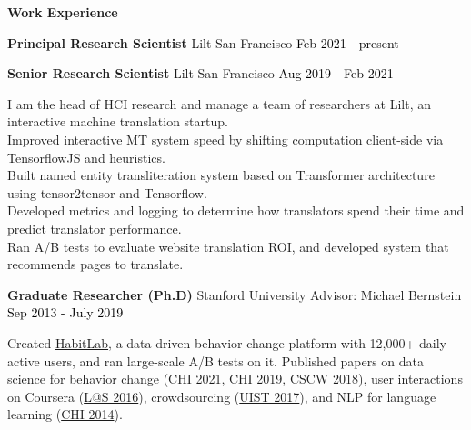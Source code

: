 \documentclass[10pt,A4]{article}
\newcommand{\cvsection}[1]
{
	\begin{center}
		\large\textcolor{sectcol}{\textbf{#1}}
	\end{center}
}
\newcommand{\cvevtzero}[4]
{

	\textbf{#2} \hspace{1mm} \textcolor{bgcol}{#3} \hfill \vspace{2.5pt}\textcolor{black}{#1}

\vspace{-8pt}
\vspace{6pt}

}
\newcommand{\cvevtzeronohrule}[4]
{

  \textbf{#2} \hspace{1mm} \textcolor{bgcol}{#3} \hfill \vspace{2.5pt}\textcolor{black}{#1}

\vspace{-8pt}
\vspace{6pt}

}
\begin{document}
\cvsection{Work Experience}

\cvevtzeronohrule{Feb 2021 - present}{Principal Research Scientist}{\textcolor{sectcol}{Lilt} \hspace{1mm} San Francisco}\\
\cvevtzero{Aug 2019 - Feb 2021}{Senior Research Scientist}{\hspace{3.2mm} \textcolor{sectcol}{Lilt} \hspace{1mm} San Francisco}\\
I am the head of HCI research and manage a team of researchers at Lilt, an interactive machine translation startup.\\
Improved interactive MT system speed by shifting computation client-side via TensorflowJS and heuristics.\\
Built named entity transliteration system based on Transformer architecture using tensor2tensor and Tensorflow.\\
Developed metrics and logging to determine how translators spend their time and predict translator performance.\\
Ran A/B tests to evaluate website translation ROI, and developed system that recommends pages to translate. \\

\vspace{-1mm}

\cvevtzero{Sep 2013 - July 2019}{Graduate Researcher (Ph.D)}{\textcolor{sectcol}{Stanford University} \hspace{1mm} Advisor: Michael Bernstein}\\
Created \hypersetup{urlcolor=black}\href{https://habitlab.github.io}{HabitLab}\hypersetup{urlcolor=linkcol}, a data-driven behavior change platform with 12,000+ daily active users, and ran large-scale A/B tests on it. Published papers on data science for behavior change (\href{https://hci.stanford.edu/publications/2021/notnow/notnowasklater.pdf}{CHI 2021}, \href{https://hci.stanford.edu/publications/2019/conservation/conservation-chi2019.pdf}{CHI 2019}, \href{https://hci.stanford.edu/publications/2018/habitlab/habitlab-cscw18.pdf}{CSCW 2018}), user interactions on Coursera (\href{https://hci.stanford.edu/publications/2016/invideo/invideo-las2016.pdf}{L@S 2016}), crowdsourcing (\href{https://hci.stanford.edu/publications/2017/crowdresearch/crowd-research-uist2017.pdf}{UIST 2017}), and NLP for language learning (\href{http://up.csail.mit.edu/other-pubs/chi2014-smartsubs.pdf}{CHI 2014}).\\
\end{document}
